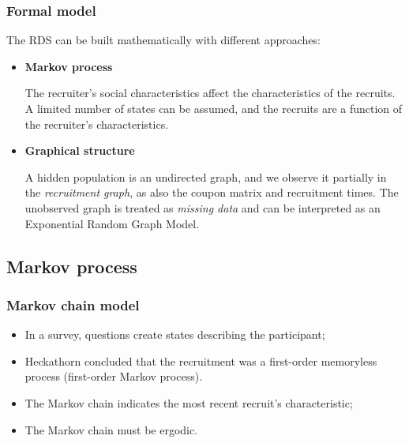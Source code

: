 \documentclass{beamer}
\newcommand{\Space}{\vspace{3ex}}
\begin{document}
\begin{frame}
  
  \frametitle{Formal model}

  The RDS can be built mathematically with different approaches: 

  \Space

  \begin{itemize}
    \justifying

    \item<1> {\bf Markov process} \cite{heckathorn1997}
  
    The recruiter's social characteristics affect the characteristics of the
    recruits. A limited number of states can be assumed, and the recruits are a
    function of the recruiter's characteristics.
  \end{itemize}

  \Space

  \begin{itemize}
    \justifying

    \item<2> {\bf Graphical structure} \cite{crawford2016}
    
    A hidden population is an undirected graph, and we observe it partially in
    the {\em recruitment graph}, as also the coupon matrix and recruitment
    times. The unobserved graph is treated as {\em missing data} and can be
    interpreted as an Exponential Random Graph Model.
  \end{itemize}  

\end{frame}

\subsection{Markov process}

\begin{frame}
  \frametitle{Markov chain model}
  
  \begin{itemize}
    \justifying
    \item In a survey, questions create states describing the participant;
    
    \Space
  
    \item Heckathorn concluded that the recruitment was a first-order memoryless
    process (first-order Markov process).
    
    \Space

    \item The Markov chain indicates the most recent recruit's characteristic;
    
    \Space
  
    \item The Markov chain must be ergodic. 
  \end{itemize}
  
  \end{frame}
\end{document}

